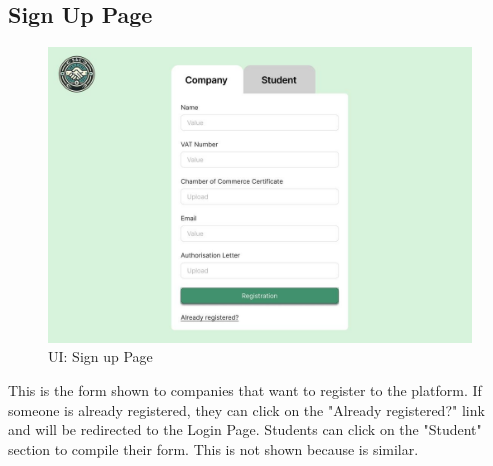 \subsection{Sign Up Page}
\begin{figure}[H]
    \centering
    \includegraphics[width=15cm]{images/ui/signup.jpg}
    \caption{UI: Sign up Page}
\end{figure}
This is the form shown to companies that want to register to the platform. If someone is already registered, they can click on the "Already registered?" link and will be redirected to the Login Page. Students can click on the "Student" section to compile their form. This is not shown because is similar.

